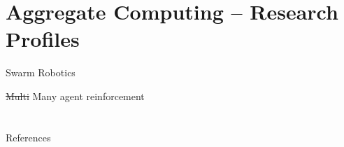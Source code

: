 \documentclass[presentation, 9pt]{beamer}\mode<presentation>{\usetheme{AMSBolognaFC}}
\begin{document}
\section{Aggregate Computing -- Research Profiles}
\begin{frame}{Swarm Robotics}

\end{frame}

\begin{frame}{\st{Multi} Many agent reinforcement}
\end{frame}
\section{}


\frame{\titlepage}

\section*{\refname}



\begin{frame}[allowframebreaks]{References}
\def\bibfont{\footnotesize}
\printbibliography
\end{frame}

\end{document}

